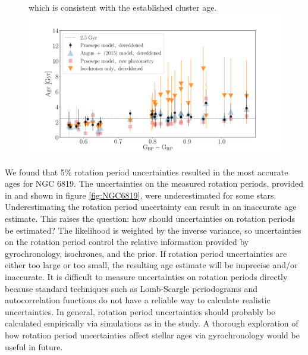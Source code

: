 {\begin{figure}
{    which is consistent with the established cluster age.
}
  \centering
    \includegraphics[width=1\textwidth]{NGC6819_results}
\label{fig:NGC6819_results}
\end{figure}

We found that 5\% rotation period uncertainties resulted in the most accurate
ages for NGC 6819.
The uncertainties on the measured rotation periods, provided in
\citet{meibom2015} and shown in figure \ref{fig:NGC6819}, were underestimated
for some stars.
Underestimating the rotation period uncertainty can result in an inaccurate
age estimate.
This raises the question: how should uncertainties on rotation periods be
estimated?
The likelihood is weighted by the inverse variance, so uncertainties on the
rotation period control the relative information provided by gyrochronology,
isochrones, and the prior.
If rotation period uncertainties are either too large or too small, the
resulting age estimate will be imprecise and/or inaccurate.
It is difficult to measure uncertainties on rotation periods directly because
standard techniques such as Lomb-Scargle periodograms and autocorrelation
functions do not have a reliable way to calculate realistic uncertainties.
In general, rotation period uncertainties should probably be calculated
empirically via simulations as in the \citet{aigrain2015} study.
A thorough exploration of how rotation period uncertainties affect stellar
ages via gyrochronology would be useful in future.}
